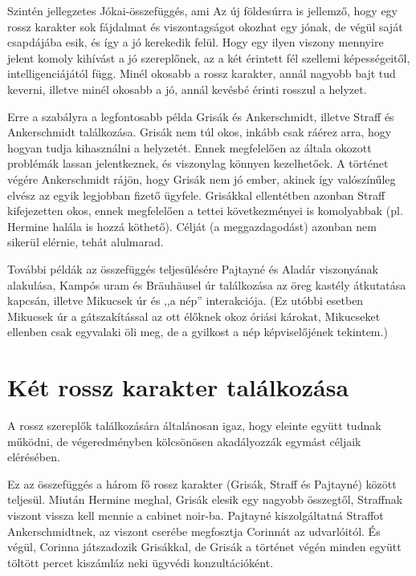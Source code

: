 \documentclass{thesis-ekf}
\begin{document}
    Szintén jellegzetes Jókai-összefüggés, ami Az új földesúrra is jellemző, hogy egy rossz karakter
        sok fájdalmat és viszontagságot okozhat egy jónak, de végül saját csapdájába esik, és így a jó kerekedik felül.
    Hogy egy ilyen viszony mennyire jelent komoly kihívást a jó szereplőnek, az a két érintett fél szellemi képességeitől,
        intelligenciájától függ.
    Minél okosabb a rossz karakter, annál nagyobb bajt tud keverni, illetve minél okosabb a jó,
        annál kevésbé érinti rosszul a helyzet.

    Erre a szabályra a legfontosabb példa Grisák és Ankerschmidt, illetve Straff és Ankerschmidt találkozása.
        Grisák nem túl okos, inkább csak ráérez arra, hogy hogyan tudja kihasználni a helyzetét.
    Ennek megfelelően az általa okozott problémák lassan jelentkeznek, és viszonylag könnyen kezelhetőek.
    A történet végére Ankerschmidt rájön, hogy Grisák nem jó ember, akinek így valószínűleg elvész az egyik
        legjobban fizető ügyfele.
    Grisákkal ellentétben azonban Straff kifejezetten okos, ennek megfelelően a tettei következményei is komolyabbak
        (pl. Hermine halála is hozzá köthető).
    Célját (a meggazdagodást) azonban nem sikerül elérnie, tehát alulmarad.

    További példák az összefüggés teljesülésére Pajtayné és Aladár viszonyának alakulása, Kampós uram és
        Bräuhäusel úr találkozása az öreg kastély átkutatása kapcsán, illetve Mikucsek úr és ,,a nép'' interakciója.
    (Ez utóbbi esetben Mikucsek úr a gátszakítással az ott élőknek okoz óriási károkat, Mikucseket ellenben csak
        egyvalaki öli meg, de a gyilkost a nép képviselőjének tekintem.)

    \section{Két rossz karakter találkozása}

    A rossz szereplők találkozására általánosan igaz, hogy eleinte együtt tudnak működni,
        de végeredményben kölcsönösen akadályozzák egymást céljaik elérésében.

    Ez az összefüggés a három fő rossz karakter (Grisák, Straff és Pajtayné) között teljesül.
    Miután Hermine meghal, Grisák elesik egy nagyobb összegtől, Straffnak viszont vissza kell mennie a cabinet noir-ba.
    Pajtayné kiszolgáltatná Straffot Ankerschmidtnek, az viszont cserébe megfosztja Corinnát az udvarlóitól.
    És végül, Corinna játszadozik Grisákkal, de Grisák a történet végén minden együtt töltött percet
        kiszámláz neki ügyvédi konzultációként.
\end{document}
